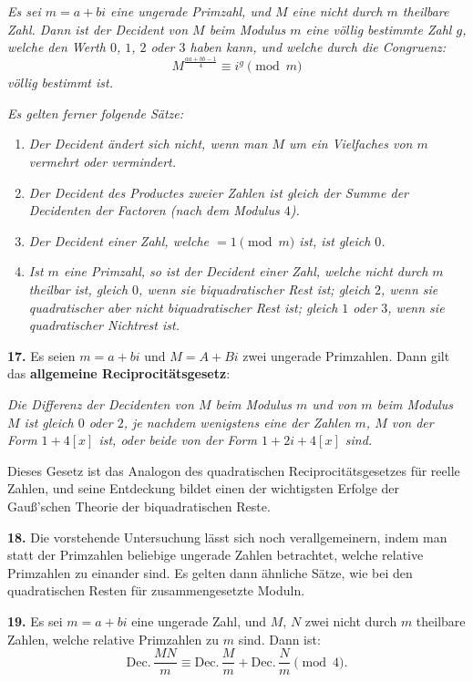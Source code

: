\documentclass[12pt,a4paper]{article}
\begin{document}
\textit{Es sei $m = a + bi$ eine ungerade Primzahl, und $M$ eine nicht durch $m$ theilbare Zahl.
Dann ist der Decident von $M$ beim Modulus $m$ eine völlig bestimmte Zahl $g$, welche den
Werth $0$, $1$, $2$ oder $3$ haben kann, und welche durch die Congruenz:}
\[
M^{\frac{aa + bb - 1}{4}} \equiv i^g \pmod{m}
\]
\textit{völlig bestimmt ist.}

\textit{Es gelten ferner folgende Sätze:}
\begin{enumerate}
\item \textit{Der Decident ändert sich nicht, wenn man $M$ um ein Vielfaches von $m$ vermehrt oder
vermindert.}
\item \textit{Der Decident des Productes zweier Zahlen ist gleich der Summe der Decidenten der Factoren
(nach dem Modulus $4$).}
\item \textit{Der Decident einer Zahl, welche $= 1 \pmod{m}$ ist, ist gleich $0$.}
\item \textit{Ist $m$ eine Primzahl, so ist der Decident einer Zahl, welche nicht durch $m$ theilbar ist,
gleich $0$, wenn sie biquadratischer Rest ist; gleich $2$, wenn sie quadratischer aber nicht biquadratischer
Rest ist; gleich $1$ oder $3$, wenn sie quadratischer Nichtrest ist.}
\end{enumerate}

\textbf{17.} Es seien $m = a + bi$ und $M = A + Bi$ zwei ungerade Primzahlen. Dann gilt das
\textbf{allgemeine Reciprocitätsgesetz}:

\textit{Die Differenz der Decidenten von $M$ beim Modulus $m$ und von $m$ beim Modulus $M$ ist
gleich $0$ oder $2$, je nachdem wenigstens eine der Zahlen $m$, $M$ von der Form $1 + 4[x]$
ist, oder beide von der Form $1 + 2i + 4[x]$ sind.}

Dieses Gesetz ist das Analogon des quadratischen Reciprocitätsgesetzes für reelle Zahlen, und
seine Entdeckung bildet einen der wichtigsten Erfolge der Gauß'schen Theorie der biquadratischen
Reste.

\textbf{18.} Die vorstehende Untersuchung lässt sich noch verallgemeinern, indem man statt der
Primzahlen beliebige ungerade Zahlen betrachtet, welche relative Primzahlen zu einander sind.
Es gelten dann ähnliche Sätze, wie bei den quadratischen Resten für zusammengesetzte Moduln.

\textbf{19.} Es sei $m = a + bi$ eine ungerade Zahl, und $M$, $N$ zwei nicht durch $m$ theilbare
Zahlen, welche relative Primzahlen zu $m$ sind. Dann ist:
\[
\text{Dec.}\,\frac{MN}{m} \equiv \text{Dec.}\,\frac{M}{m} + \text{Dec.}\,\frac{N}{m} \pmod{4}.
\]
\end{document}
